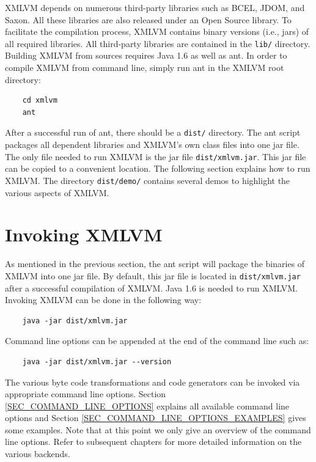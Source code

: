 \documentclass[11pt]{book}
\begin{document}
XMLVM depends on numerous third-party libraries such as BCEL, JDOM, and
Saxon. All these libraries are also released under an Open Source
library. To facilitate the compilation process, XMLVM contains binary
versions (i.e., jars) of all required libraries. All third-party
libraries are contained in the \texttt{lib/} directory. Building XMLVM
from sources requires Java 1.6 as well as ant. In order to compile
XMLVM from command line, simply run ant in the XMLVM root directory:

\begin{verbatim}
    cd xmlvm
    ant
\end{verbatim}

After a successful run of ant, there should be a \texttt{dist/}
directory. The ant script packages all dependent libraries and XMLVM's
own class files into one jar file. The only file needed to run XMLVM
is the jar file \texttt{dist/xmlvm.jar}. This jar file can be copied
to a convenient location. The following section explains how to run
XMLVM. The directory \texttt{dist/demo/} contains several demos to
highlight the various aspects of XMLVM.


\section{Invoking XMLVM}
\label{SEC_INVOKING_XMLVM}

As mentioned in the previous section, the ant script will package the
binaries of XMLVM into one jar file. By default, this jar file is
located in \texttt{dist/xmlvm.jar} after a successful compilation of
XMLVM. Java 1.6 is needed to run XMLVM. Invoking XMLVM can be done in
the following way:

\begin{verbatim}
    java -jar dist/xmlvm.jar
\end{verbatim}

Command line options can be appended at the end of the command line
such as:

\begin{verbatim}
    java -jar dist/xmlvm.jar --version
\end{verbatim}

The various byte code transformations and code generators can be
invoked via appropriate command line options. Section
\ref{SEC_COMMAND_LINE_OPTIONS} explains all available command line
options and Section \ref{SEC_COMMAND_LINE_OPTIONS_EXAMPLES} gives some
examples. Note that at this point we only give an overview of the
command line options. Refer to subsequent chapters for more detailed
information on the various backends.
\end{document}
